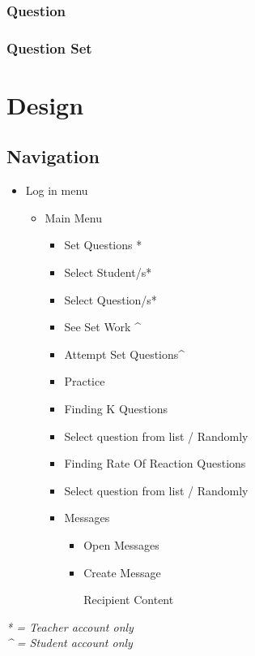 \documentclass[a4paper,12pt]{report}
\begin{document}
\subsection{Question}

\subsection{Question Set}

\chapter{Design}
\section{Navigation}

\begin{itemize}
\item Log in menu

\begin{itemize}
\item Main Menu

\begin{itemize}
\item Set Questions *
\item Select Student/s*
\item Select Question/s*
\item See Set Work \^{}
\item Attempt Set Questions\^{}
\item Practice
\item Finding K Questions
\item Select question from list / Randomly
\item Finding Rate Of Reaction Questions
\item Select question from list / Randomly
\item Messages

\begin{itemize}
\item Open Messages
\item Create Message

Recipient
Content
\end{itemize}
\end{itemize}
\end{itemize}
\end{itemize}


\emph{* = Teacher account only} \\
\emph{\^{} = Student account only}
\end{document}
